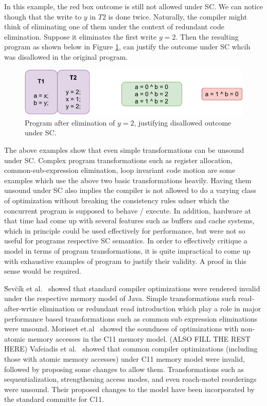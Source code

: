     In this example, the red box outcome is still not allowed under SC. We can notice though that the write to $y$ in $T2$ is done twice. 
    Naturally, the compiler might think of eliminating one of them under the context of redundant code elimination. 
    Suppose it eliminates the first write $y=2$. 
    Then the resulting program as shown below in Figure \ref{intro:Example3(b)}, can justify the outcome under SC whcih was disallowed in the original program.
    \begin{figure}[H]
        \centering
        \includegraphics[scale=0.7]{2.Background/SC_Example2(a).pdf}
        \caption{Program after elimination of $y=2$, justifying disallowed outcome under SC.}
        \label{intro:Example3(b)}
    \end{figure}

    The above examples show that even simple transformations can be unsound under SC. Complex program transformations such as register allocation, common-sub-expression elimination, loop invariant code motion are some examples which use the above two basic transformations heavily. 
    Having them unsound under SC also implies the compiler is not allowed to do a varying class of optimization without breaking the consistency rules udner which the concurrent program is supposed to behave / execute. 
    In addition, hardware at that time had come up with several features such as buffers and cache systems, which in principle could be used effectively for performance, but were not so useful for programs respective SC semantics. 
    In order to effectively critique a model in terms of program transformations, it is quite impractical to come up with exhaustive examples of program to justify their validity.
    A proof in this sense would be required.  

    \u{S}ev\u{c}\'{i}k et al.~\cite{SevcikJ} showed that standard compiler optimizations were rendered invalid under the respective memory model of Java. Simple transformations such read-after-wrtie elimination or redundant read introduction which play a role in major performance based transformations such as common sub expression eliminations were unsound. 
    Morisset et.al~\cite{Morisset} showed the soundness of optimizations with non-atomic memory accesses in the C11 memory model. (ALSO FILL THE REST HERE) 
    Vafeiadis et al.~\cite{VafeiadisV} showed that common compiler optimizations (including those with atomic memory accesses) under C11 memory model were invalid, followed by proposing some changes to allow them. Transformations such as sequentialization, strengthening access modes, and even roach-motel reorderings were unsound. Their proposed changes to the model have been incorporated by the standard committe for C11. 

